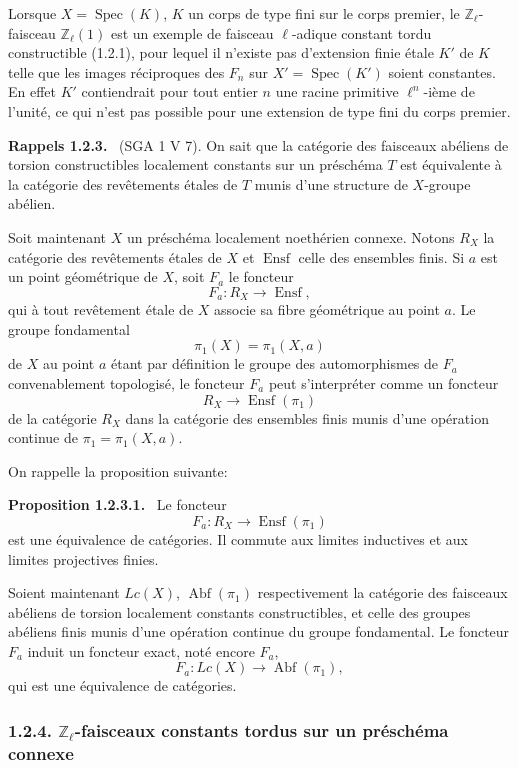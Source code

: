 \documentclass[11pt]{article}
\newenvironment{statement}[1]{\par\medskip\noindent\textbf{#1.}\ }{\par\medskip}
\DeclareMathOperator{\Spec}{Spec}
\providecommand{\Ensf}{\operatorname{Ensf}}
\providecommand{\Abf}{\operatorname{Abf}}
\providecommand{\Spec}{\operatorname{Spec}}
\providecommand{\Spec}{\operatorname{Spec}}
\providecommand{\Spec}{\operatorname{Spec}}
\providecommand{\Spec}{\operatorname{Spec}}
\begin{document}
Lorsque \(X=\Spec(K)\), \(K\) un corps de type fini sur le corps premier, le \(\mathbb Z_\ell\)-faisceau \(\mathbb Z_\ell(1)\) est un exemple de faisceau \(\ell\)-adique constant tordu constructible (1.2.1), pour lequel il n'existe pas d'extension finie étale \(K'\) de \(K\) telle que les images réciproques des \(F_n\) sur \(X'=\Spec(K')\) soient constantes. En effet \(K'\) contiendrait pour tout entier \(n\) une racine primitive \(\ell^n\)-ième de l'unité, ce qui n'est pas possible pour une extension de type fini du corps premier.

\begin{statement}{Rappels 1.2.3}
(SGA 1 V 7). On sait que la catégorie des faisceaux abéliens de torsion constructibles localement constants sur un préschéma \(T\) est équivalente à la catégorie des revêtements étales de \(T\) munis d'une structure de \(X\)-groupe abélien.
\end{statement}

Soit maintenant \(X\) un préschéma localement noethérien connexe. Notons \(R_X\) la catégorie des revêtements étales de \(X\) et \(\Ensf\) celle des ensembles finis. Si \(a\) est un point géométrique de \(X\), soit \(F_a\) le foncteur
\[
F_a:R_X\longrightarrow \Ensf,
\]
qui à tout revêtement étale de \(X\) associe sa fibre géométrique au point \(a\). Le groupe fondamental
\[
\pi_1(X)=\pi_1(X,a)
\]
de \(X\) au point \(a\) étant par définition le groupe des automorphismes de \(F_a\) convenablement topologisé, le foncteur \(F_a\) peut s'interpréter comme un foncteur
\[
R_X\longrightarrow \Ensf(\pi_1)
\]
de la catégorie \(R_X\) dans la catégorie des ensembles finis munis d'une opération continue de \(\pi_1=\pi_1(X,a)\).

On rappelle la proposition suivante:

\begin{statement}{Proposition 1.2.3.1}
Le foncteur
\[
F_a:R_X\longrightarrow \Ensf(\pi_1)
\]
est une équivalence de catégories. Il commute aux limites inductives et aux limites projectives finies.
\end{statement}

Soient maintenant \(Lc(X)\), \(\Abf(\pi_1)\) respectivement la catégorie des faisceaux abéliens de torsion localement constants constructibles, et celle des groupes abéliens finis munis d'une opération continue du groupe fondamental. Le foncteur \(F_a\) induit un foncteur exact, noté encore \(F_a\),
\[
F_a:Lc(X)\longrightarrow \Abf(\pi_1),
\]
qui est une équivalence de catégories.

\subsubsection*{1.2.4. \(\mathbb Z_\ell\)-faisceaux constants tordus sur un préschéma connexe}
\end{document}
